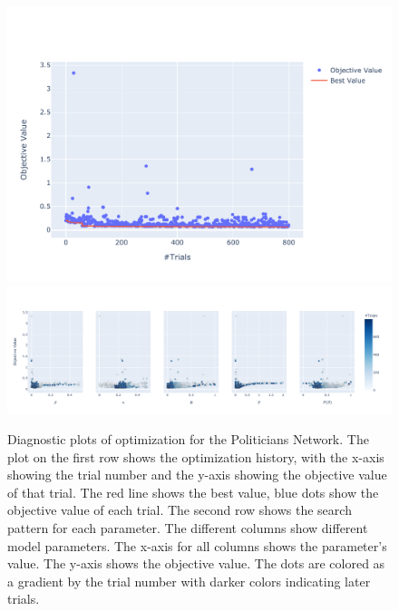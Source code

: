 \documentclass[11pt]{article}
\begin{document}
\begin{figure}[H]
    \centering
    \includegraphics[width=.7\linewidth]{../plots/overall/Optimization_History_politicians.pdf}
    \includegraphics[width=.7\linewidth]{../plots/overall/Plot_Slice_politicians.pdf}
  \caption{Diagnostic plots of optimization for the Politicians Network. The plot on the first row shows the optimization history, with the x-axis showing the trial number and the y-axis showing the objective value of that trial. The red line shows the best value, blue dots show the objective value of each trial. The second row shows the search pattern for each parameter. The different columns show different model parameters. The x-axis for all columns shows the parameter's value. The y-axis shows the objective value. The dots are colored as a gradient by the trial number with darker colors indicating later trials.}
  \label{appendix:optimization_politicians}
\end{figure}
\end{document}
